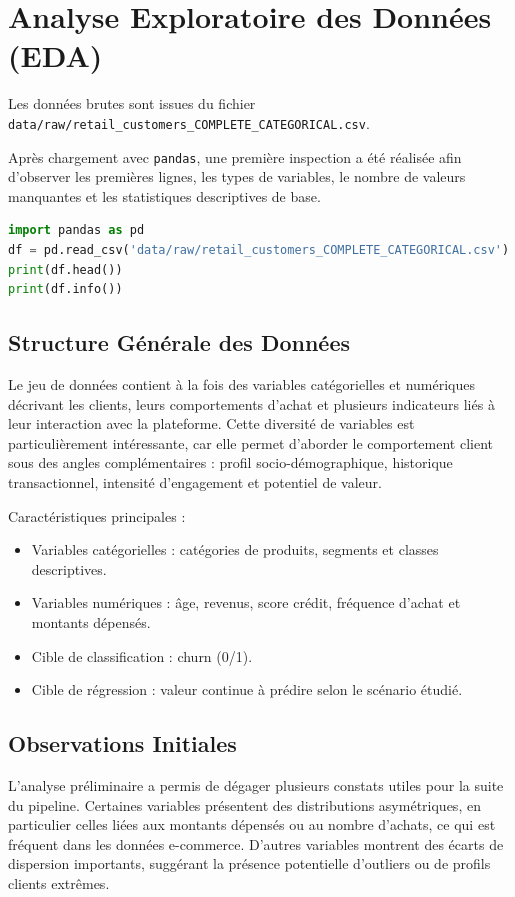 \documentclass[11pt,a4paper]{article}
\begin{document}
\section{Analyse Exploratoire des Données (EDA)}

Les données brutes sont issues du fichier \texttt{data/raw/retail\_customers\_COMPLETE\_CATEGORICAL.csv}.

Après chargement avec \texttt{pandas}, une première inspection a été réalisée afin d'observer les premières lignes, les types de variables, le nombre de valeurs manquantes et les statistiques descriptives de base.

\begin{lstlisting}[language=Python, caption=Chargement des données]
import pandas as pd
df = pd.read_csv('data/raw/retail_customers_COMPLETE_CATEGORICAL.csv')
print(df.head())
print(df.info())
\end{lstlisting}

\subsection{Structure Générale des Données}
Le jeu de données contient à la fois des variables catégorielles et numériques décrivant les clients, leurs comportements d'achat et plusieurs indicateurs liés à leur interaction avec la plateforme. Cette diversité de variables est particulièrement intéressante, car elle permet d'aborder le comportement client sous des angles complémentaires : profil socio-démographique, historique transactionnel, intensité d'engagement et potentiel de valeur.

Caractéristiques principales :
\begin{itemize}
    \item Variables catégorielles : catégories de produits, segments et classes descriptives.
    \item Variables numériques : âge, revenus, score crédit, fréquence d'achat et montants dépensés.
    \item Cible de classification : churn (0/1).
    \item Cible de régression : valeur continue à prédire selon le scénario étudié.
\end{itemize}

\subsection{Observations Initiales}
L'analyse préliminaire a permis de dégager plusieurs constats utiles pour la suite du pipeline. Certaines variables présentent des distributions asymétriques, en particulier celles liées aux montants dépensés ou au nombre d'achats, ce qui est fréquent dans les données e-commerce. D'autres variables montrent des écarts de dispersion importants, suggérant la présence potentielle d'outliers ou de profils clients extrêmes.
\end{document}

